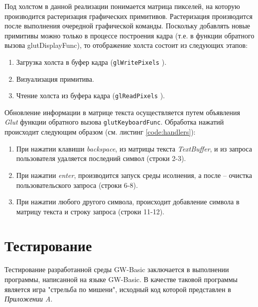 \documentclass[12pt]{article}
\begin{document}
			\indent Под холстом в данной реализации понимается матрица пикселей, на которую производится растеризация графических примитивов. Растеризация производится после выполнения очередной графической команды. Поскольку добавлять новые примитивы можно только в процессе построения кадра (т.е. в функции обратного вызова glutDisplayFunc), то отображение холста состоит из следующих этапов:
			\begin{enumerate}
				\item Загрузка холста в буфер кадра ({\tt glWritePixels} \cite{glManual}).
				\item Визуализация примитива.
				\item Чтение холста из буфера кадра ({\tt glReadPixels} \cite{glManual}).
			\end{enumerate} 

			\indent Обновление информации в матрице текста осуществляется путем объявления {\it Glut} функции обратного вызова {\tt glutKeyboardFunc}. Обработка нажатий происходит следующим образом (см. листинг \ref{code:handlers}):
			\begin{enumerate}
				\item При нажатии клавиши {\it backspace}, из матрицы текста {\it TextBuffer}, и из запроса пользователя удаляется последний символ (строки 2-3).
				\item При нажатии {\it enter}, производится запуск среды исолнения, а после -- очистка пользовательского запроса (строки 6-8).
				\item При нажатии любого другого символа, происходит добавление символа в матрицу текста и строку запроса (строки 11-12).
			\end{enumerate}
			
				
	\newpage
	\section{Тестирование}
		\hspace{\parindent} Тестирование разработанной среды GW-Basic заключается в выполнении программы, написанной на языке GW-Basic. В качестве таковой программы является игра "стрельба по мишени", исходный код которой представлен в {\it Приложении A}.
		
\end{document}
